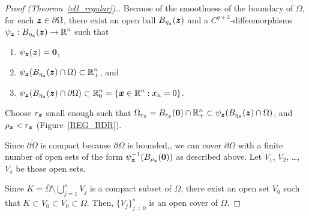 
\begin{proof}[Proof (Theorem~\ref{ell_regular}).]
Because of the smoothness of the boundary of $\Omega$, for
each ${\bm{z}} \in \partial \Omega$, there exist an open ball
$B_{\eta_{{\bm{z}}}}({\bm{z}})$ and a $\displaystyle C^{q+2}$-diffeomorphisms
$\displaystyle \psi_{{\bm{z}}}:B_{\eta_{{\bm{z}}}}({\bm{z}}) \rightarrow \mathbb{R}^n$
such that
\begin{enumerate}
\item $\psi_{\bm{z}}({\bm{z}})={\bm{0}}$,
\item $\displaystyle \psi_{\bm{z}}(B_{\eta_{\bm{z}}}({\bm{z}})\cap \Omega)
\subset \mathbb{R}^n_+$, and
\item $\displaystyle \psi_{\bm{z}}(B_{\eta_{\bm{z}}}({\bm{z}})\cap
\partial \Omega) \subset \mathbb{R}^n_0=\{{\bm{x}} \in \mathbb{R}^n : x_n=0 \}$.
\end{enumerate}
Choose $r_{\bm{z}}$ small enough such that
$\displaystyle \Omega_{r_{\bm{z}}} = B_{r_{{\bm{z}}}}({\bm{0}}) \cap \mathbb{R}^n_+
\subset \psi_{\bm{z}}(B_{\eta_{\bm{z}}}({\bm{z}})\cap \Omega)$,
and $\rho_{{\bm{z}}} < r_{\bm{z}}$ (Figure~\ref{REG_BDR}).

Since $\overline{\partial \Omega}$ is compact because $\partial \Omega$
is bounded,, we can cover $\partial \Omega$ with a finite
number of open sets of the form
$\displaystyle \psi_{{\bm{z}}}^{-1}(B_{\rho_{\bm{z}}}({\bm{0}}))$
as described above.  Let $V_1$, $V_2$, \ldots, $V_s$ be those open sets.

Since $\displaystyle K = \overline{\Omega} \setminus \bigcup_{j=1}^s V_j$
is a compact subset of $\Omega$, there exist an open set $V_0$ such
that $K \subset V_0 \subset \overline{V_0} \subset \Omega$.
Then, $\displaystyle \{ V_j \}_{j=0}^s$ is an open cover of $\Omega$.


\end{proof}
